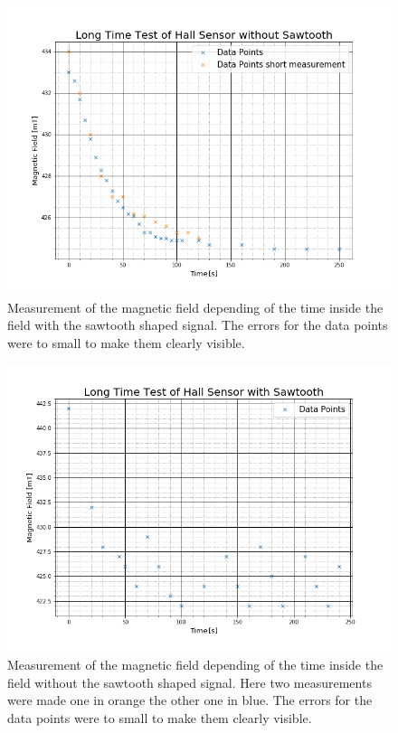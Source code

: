 \begin{figure}[ht]
	\includegraphics[scale=0.5]{Bild/Hallsonde1}
	\centering
	\caption[Hall Sensor without Sawtooth]{Measurement of the magnetic field depending of the time inside the field with the sawtooth shaped signal. The errors for the data points were to small to make them clearly visible.}
	\label{Hallsonde1}
\end{figure}
\begin{figure}[ht]
	\includegraphics[scale=0.5]{Bild/Hallsonde2}
	\centering
	\caption[Hall Sensor with Sawtooth]{Measurement of the magnetic field depending of the time inside the field without the sawtooth shaped signal. Here two measurements were made one in orange the other one in blue. The errors for the data points were to small to make them clearly visible.}
	\label{Hallsonde2}
\end{figure}
